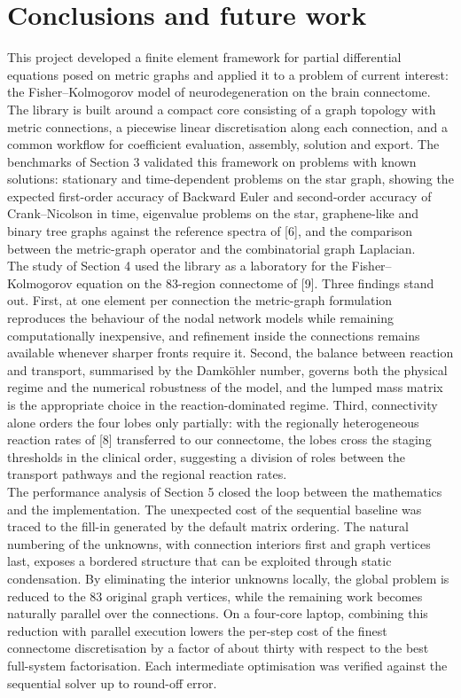 \documentclass[11pt,a4paper]{article}
\begin{document}
\section{Conclusions and future work}

This project developed a finite element framework for partial differential
equations posed on metric graphs and applied it to a problem of current
interest: the Fisher--Kolmogorov model of neurodegeneration on the brain
connectome. The library is built around a compact core consisting of a graph
topology with metric connections, a piecewise linear discretisation along
each connection, and a common workflow for coefficient evaluation, assembly,
solution and export. The benchmarks of Section 3 validated this framework on
problems with known solutions: stationary and time-dependent problems on the
star graph, showing the expected first-order accuracy of Backward Euler and
second-order accuracy of Crank--Nicolson in time, eigenvalue problems on the
star, graphene-like and binary tree graphs against the reference spectra of [6],
and the comparison between the metric-graph operator and the combinatorial
graph Laplacian.\\

The study of Section 4 used the library as a laboratory for the
Fisher--Kolmogorov equation on the 83-region connectome of [9]. Three findings
stand out. First, at one element per connection the metric-graph formulation
reproduces the behaviour of the nodal network models while remaining
computationally inexpensive, and refinement inside the connections remains
available whenever sharper fronts require it. Second, the balance between
reaction and transport, summarised by the Damk\"ohler number, governs both the
physical regime and the numerical robustness of the model, and the lumped
mass matrix is the appropriate choice in the reaction-dominated regime.
Third, connectivity alone orders the four lobes only partially: with the
regionally heterogeneous reaction rates of [8] transferred to our connectome,
the lobes cross the staging thresholds in the clinical order, suggesting a
division of roles between the transport pathways and the regional reaction
rates.\\

The performance analysis of Section 5 closed the loop between the mathematics
and the implementation. The unexpected cost of the sequential baseline was
traced to the fill-in generated by the default matrix ordering. The natural
numbering of the unknowns, with connection interiors first and graph vertices
last, exposes a bordered structure that can be exploited through static
condensation. By eliminating the interior unknowns locally, the global problem
is reduced to the 83 original graph vertices, while the remaining work becomes
naturally parallel over the connections. On a four-core laptop, combining
this reduction with parallel execution lowers the per-step cost of the finest
connectome discretisation by a factor of about thirty with respect to the best
full-system factorisation. Each intermediate optimisation was verified against
the sequential solver up to round-off error.\\
\end{document}
